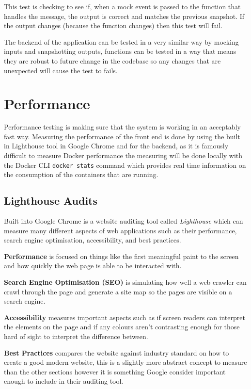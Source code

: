 This test is checking to see if, when a mock event is passed to the function that handles the message, the output is correct and matches the previous snapshot. If the output changes (because the function changes) then this test will fail.

The backend of the application can be tested in a very similar way by mocking inputs and snapshotting outputs, functions can be tested in a way that means they are robust to future change in the codebase so any changes that are unexpected will cause the test to fails.

\section{Performance} \label{test:perf}

Performance testing is making sure that the system is working in an acceptably fast way. Measuring the performance of the front end is done by using the built in Lighthouse tool in Google Chrome and for the backend, as it is famously difficult to measure Docker performance \cite{docker-perf} the measuring will be done locally with the Docker CLI \texttt{docker stats} command which provides real time information on the consumption of the containers that are running.

\subsection{Lighthouse Audits} \label{test:perf-light}

Built into Google Chrome is a website auditing tool called \textit{Lighthouse} \cite{google-lighthouse} which can measure many different aspects of web applications such as their performance, search engine optimisation, accessibility, and best practices. 

\textbf{Performance} is focused on things like the first meaningful paint to the screen and how quickly the web page is able to be interacted with. 

\textbf{Search Engine Optimisation (SEO)} is simulating how well a web crawler can crawl through the page and generate a site map so the pages are visible on a search engine. 

\textbf{Accessibility} measures important aspects such as if screen readers can interpret the elements on the page and if any colours aren't contrasting enough for those hard of sight to interpret the difference between.

\textbf{Best Practices} compares the website against industry standard on how to create a good modern website, this is a slightly more abstract concept to measure than the other sections however it is something Google consider important enough to include in their auditing tool. 

